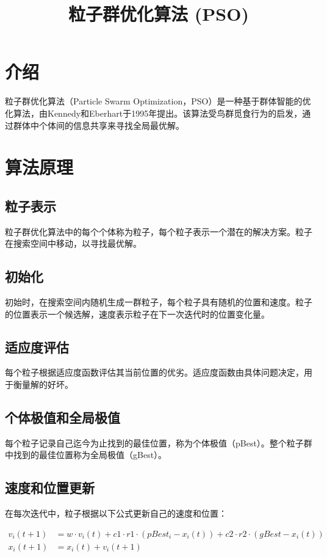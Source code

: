 \documentclass{article}
\title{粒子群优化算法 (PSO)}
\author{}
\date{}
\begin{document}
\maketitle

\section{介绍}
粒子群优化算法（Particle Swarm Optimization，PSO）是一种基于群体智能的优化算法，由Kennedy和Eberhart于1995年提出。该算法受鸟群觅食行为的启发，通过群体中个体间的信息共享来寻找全局最优解。

\section{算法原理}

\subsection{粒子表示}
粒子群优化算法中的每个个体称为粒子，每个粒子表示一个潜在的解决方案。粒子在搜索空间中移动，以寻找最优解。

\subsection{初始化}
初始时，在搜索空间内随机生成一群粒子，每个粒子具有随机的位置和速度。粒子的位置表示一个候选解，速度表示粒子在下一次迭代时的位置变化量。

\subsection{适应度评估}
每个粒子根据适应度函数评估其当前位置的优劣。适应度函数由具体问题决定，用于衡量解的好坏。

\subsection{个体极值和全局极值}
每个粒子记录自己迄今为止找到的最佳位置，称为个体极值（pBest）。整个粒子群中找到的最佳位置称为全局极值（gBest）。

\subsection{速度和位置更新}
在每次迭代中，粒子根据以下公式更新自己的速度和位置：

\begin{align}
v_{i}(t+1) &= w \cdot v_{i}(t) + c1 \cdot r1 \cdot (pBest_{i} - x_{i}(t)) + c2 \cdot r2 \cdot (gBest - x_{i}(t)) \\
x_{i}(t+1) &= x_{i}(t) + v_{i}(t+1)
\end{align}
\end{document}

